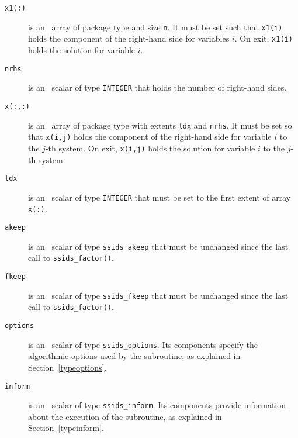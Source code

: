 \begin{description}
\item[\texttt{x1(:)}] is an \intentinout\ array of package type and size
\texttt{n}. It must be set such that \texttt{x1(i)} holds the component of
the right-hand side for variables $i$. On exit, \texttt{x1(i)} holds the
solution for variable $i$.

\item[\texttt{nrhs}] is an \intentin\ scalar of type {\tt INTEGER} that holds
the number of right-hand sides.

\item[\texttt{x(:,:)}] is an \intentinout\ array of package type with extents
\texttt{ldx} and \texttt{nrhs}. It must be set so that \texttt{x(i,j)} holds the
component of the right-hand side for variable $i$ to the $j$-th
system. On exit, \texttt{x(i,j)} holds the solution for variable $i$ to
the $j$-th system.

\item[\texttt{ldx}] is an \intentin\ scalar of type {\tt INTEGER} that must be
   set to the first extent of array \texttt{x(:)}.

\item[\texttt{akeep}]  is an \intentin\ scalar of type {\tt ssids\_akeep} that
must be unchanged since the last call to {\tt ssids\_factor()}.

\item[\texttt{fkeep}]  is an \intentin\ scalar of type {\tt ssids\_fkeep} that
must be unchanged since the last call to {\tt ssids\_factor()}.

\item[\texttt{options}] is an \intentin\ scalar of type {\tt ssids\_options}.
Its components specify the algorithmic options used by the subroutine, as
explained in Section~\ref{typeoptions}.

\item[\texttt{inform}] is an \intentout\ scalar of type
{\tt ssids\_inform}. Its components provide information about the execution
of the subroutine, as explained in Section~\ref{typeinform}.


\end{description}
